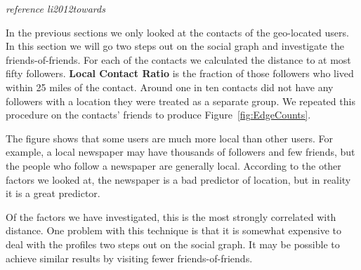 \emph{reference li2012towards}

In the previous sections we only looked at the contacts of the geo-located
users. In this section we will go two steps out on the social graph and
investigate the friends-of-friends.
%
For each of the contacts we calculated the distance to at most fifty followers.
%
\textbf{Local Contact Ratio} is the fraction of those followers who lived within 25 miles
of the contact.
%
Around one in ten contacts did not have any followers with a location they were
treated as a separate group.
%
We repeated this procedure on the contacts' friends to produce
Figure~\ref{fig:EdgeCounts}.

The figure shows that some users are much more local than other users.
For example, a local newspaper may have thousands of followers and few friends,
but the people who follow a newspaper are generally local.
According to the other factors we looked at, the newspaper is a bad predictor
of location, but in reality it is a great predictor.

Of the factors we have investigated, this is the most strongly correlated with
distance.
One problem with this technique is that it is somewhat expensive to deal with
the profiles two steps out on the social graph.
It may be possible to achieve similar results by visiting fewer
friends-of-friends.
